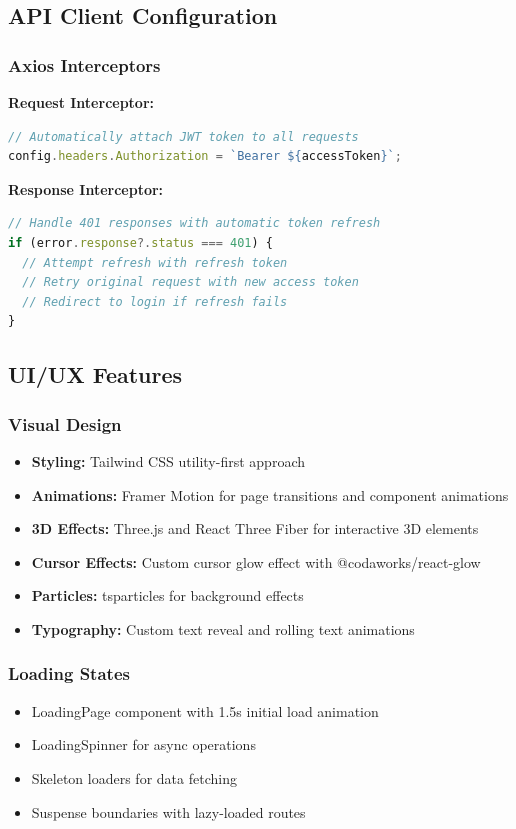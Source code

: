 \documentclass[11pt,a4paper]{article}
\begin{document}
\subsection{API Client Configuration}

\subsubsection{Axios Interceptors}
\textbf{Request Interceptor:}
\begin{lstlisting}[language=TypeScript]
// Automatically attach JWT token to all requests
config.headers.Authorization = `Bearer ${accessToken}`;
\end{lstlisting}

\textbf{Response Interceptor:}
\begin{lstlisting}[language=TypeScript]
// Handle 401 responses with automatic token refresh
if (error.response?.status === 401) {
  // Attempt refresh with refresh token
  // Retry original request with new access token
  // Redirect to login if refresh fails
}
\end{lstlisting}

\subsection{UI/UX Features}

\subsubsection{Visual Design}
\begin{itemize}[leftmargin=*]
    \item \textbf{Styling:} Tailwind CSS utility-first approach
    \item \textbf{Animations:} Framer Motion for page transitions and component animations
    \item \textbf{3D Effects:} Three.js and React Three Fiber for interactive 3D elements
    \item \textbf{Cursor Effects:} Custom cursor glow effect with @codaworks/react-glow
    \item \textbf{Particles:} tsparticles for background effects
    \item \textbf{Typography:} Custom text reveal and rolling text animations
\end{itemize}

\subsubsection{Loading States}
\begin{itemize}[leftmargin=*]
    \item LoadingPage component with 1.5s initial load animation
    \item LoadingSpinner for async operations
    \item Skeleton loaders for data fetching
    \item Suspense boundaries with lazy-loaded routes
\end{itemize}
\end{document}
